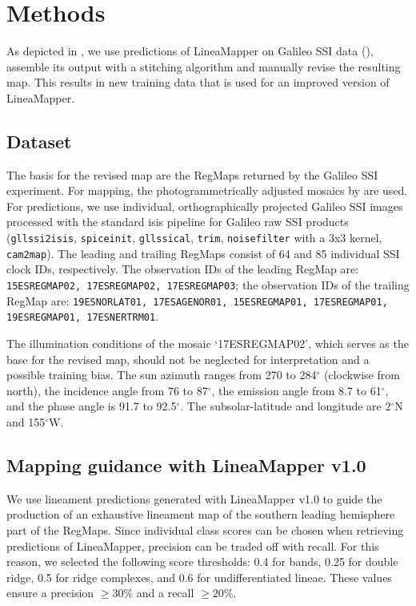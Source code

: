 \section{Methods}
As depicted in , we use predictions of LineaMapper on Galileo SSI data (), assemble its output with a stitching algorithm and manually revise the resulting map. This results in new training data that is used for an improved version of LineaMapper.

\subsection{Dataset}\label{sec:dataset}
The basis for the revised map are the RegMaps returned by the Galileo SSI experiment. For mapping, the photogrammetrically adjusted mosaics by are used. For predictions, we use individual, orthographically projected Galileo SSI images processed with the standard isis pipeline for Galileo raw SSI products (\texttt{gllssi2isis}, \texttt{spiceinit}, \texttt{gllssical}, \texttt{trim}, \texttt{noisefilter} with a 3x3 kernel, \texttt{cam2map}). The leading and trailing RegMaps consist of 64 and 85 individual SSI clock IDs, respectively. The observation IDs of the leading RegMap are: \texttt{15ESREGMAP02, 17ESREGMAP02, 17ESREGMAP03}; the observation IDs of the trailing RegMap are: \texttt{19ESNORLAT01, 17ESAGENOR01, 15ESREGMAP01, 17ESREGMAP01, 19ESREGMAP01, 17ESNERTRM01}.


The illumination conditions of the mosaic `17ESREGMAP02', which serves as the base for the revised map, should not be neglected for interpretation and a possible training bias. The sun azimuth ranges from 270 to 284$^{\circ}$ (clockwise from north), the incidence angle from 76 to 87$^{\circ}$, the emission angle from 8.7 to 61$^{\circ}$, and the phase angle is 91.7 to 92.5$^{\circ}$. The subsolar-latitude and longitude are 2$^{\circ}$N and 155$^{\circ}$W. 


\subsection{Mapping guidance with LineaMapper v1.0}\label{sec:mapping_guidance}
We use lineament predictions generated with LineaMapper v1.0 to guide the production of an exhaustive lineament map of the southern leading hemisphere part of the RegMaps. Since individual class scores can be chosen when retrieving predictions of LineaMapper, precision can be traded off with recall. For this reason, we selected the following score thresholds: 0.4 for bands, 0.25 for double ridge, 0.5 for ridge complexes, and 0.6 for undifferentiated lineae. These values ensure a precision $\geq 30\%$ and a recall $\geq 20\%$.

